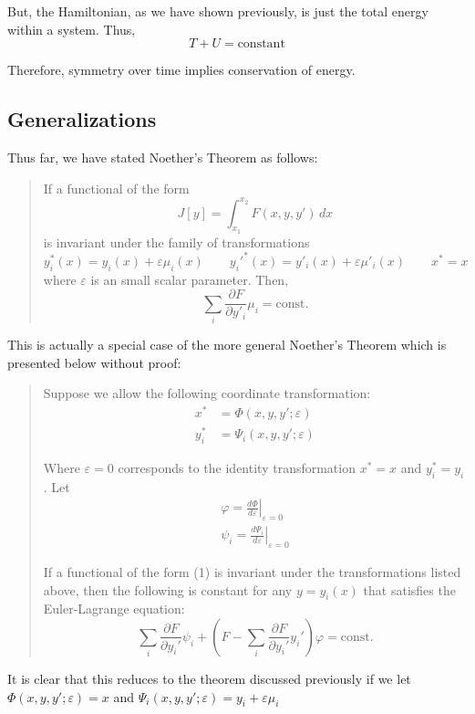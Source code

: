 \documentclass[12pt]{article}
\begin{document}
But, the Hamiltonian, as we have shown previously, is just the total energy within a system. Thus,
\begin{equation*}
T + U = \text{constant}
\end{equation*} 

Therefore, symmetry over time implies conservation of energy.

\pagebreak
\subsection{Generalizations}

Thus far, we have stated Noether's Theorem as follows: 
\begin{quote}
If a functional of the form
$$
J[y] = \int_{x_1}^{x_2} F(x, y, y') \, dx
$$
is invariant under the family of transformations
$$
y_i^*(x) = y_i(x) + \varepsilon \mu_i (x) \qquad
y_i'^*(x) = y'_i(x) + \varepsilon \mu'_i (x) \qquad
x^* = x
$$
where $\varepsilon$ is an small scalar parameter. Then, 
\begin{equation*}
\sum_i \frac{\partial F}{\partial y'_i} \mu_i = \text{const.}
\end{equation*}
\end{quote}

This is actually a special case of the more general Noether's Theorem which is presented below without proof: 

\begin{quote}
Suppose we allow the following coordinate transformation:
\begin{align*}
x^* 	&= \Phi   (x, y, y'; \varepsilon) \\
y_i^* 	&= \Psi_i (x, y, y'; \varepsilon) 
\end{align*}

Where $\varepsilon = 0$ corresponds to the identity transformation $x^* = x$ and $y_i^* = y_i$. Let
\begin{align*}
\varphi = \left. \frac{d \Phi}{d \varepsilon} \right|_{\varepsilon = 0} \\
\psi_i 	= \left. \frac{d \Psi_i}{d \varepsilon} \right|_{\varepsilon = 0}
\end{align*}

If a functional of the form (1) is invariant under the transformations listed above, then the following is constant for any $y = y_i(x)$ that satisfies the Euler-Lagrange equation:
\begin{equation}
\sum_i \frac{\partial F}{\partial y_i'} \psi_i + \left(F - \sum_i \frac{\partial F}{\partial y_i'} y_i' \right) \varphi = \text{const.}
\end{equation}
\end{quote}

It is clear that this reduces to the theorem discussed previously if we let $\Phi (x, y, y'; \varepsilon) = x$ and $\Psi_i (x, y, y'; \varepsilon) = y_i + \varepsilon \mu_i$
\end{document}
